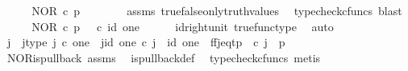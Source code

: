 \begin{isabellebody}
\ \ \isamarkupfalse%
\ \isamarkupfalse%
\ {\isachardoublequoteopen}NOR\ {\isasymcirc}\isactrlsub c\ {\isasymlangle}{\isasymt}{\isacharcomma}{\kern0pt}p{\isasymrangle}\ {\isacharequal}{\kern0pt}\ {\isasymt}{\isachardoublequoteclose}\isanewline
\ \ \ \ \isamarkupfalse%
\ assms\ true{\isacharunderscore}{\kern0pt}false{\isacharunderscore}{\kern0pt}only{\isacharunderscore}{\kern0pt}truth{\isacharunderscore}{\kern0pt}values\ \isamarkupfalse%
\ {\isacharparenleft}{\kern0pt}typecheck{\isacharunderscore}{\kern0pt}cfuncs{\isacharcomma}{\kern0pt}\ blast{\isacharparenright}{\kern0pt}\isanewline
\ \ \isamarkupfalse%
\ \isamarkupfalse%
\ {\isachardoublequoteopen}NOR\ {\isasymcirc}\isactrlsub c\ {\isasymlangle}{\isasymt}{\isacharcomma}{\kern0pt}p{\isasymrangle}\ {\isacharequal}{\kern0pt}\ {\isasymt}\ {\isasymcirc}\isactrlsub c\ id\ one{\isachardoublequoteclose}\isanewline
\ \ \ \ \isamarkupfalse%
\ id{\isacharunderscore}{\kern0pt}right{\isacharunderscore}{\kern0pt}unit{}\ true{\isacharunderscore}{\kern0pt}func{\isacharunderscore}{\kern0pt}type\ \isamarkupfalse%
\ auto\isanewline
\ \ \isamarkupfalse%
\ \isamarkupfalse%
\ j\ \ j{\isacharunderscore}{\kern0pt}type{\isacharcolon}{\kern0pt}\ {\isachardoublequoteopen}j\ {\isasymin}\isactrlsub c\ one{\isachardoublequoteclose}\ \ j{\isacharunderscore}{\kern0pt}id{\isacharcolon}{\kern0pt}\ {\isachardoublequoteopen}{\isasymbeta}\isactrlbsub one\isactrlesub \ {\isasymcirc}\isactrlsub c\ j\ {\isacharequal}{\kern0pt}\ id\ one{\isachardoublequoteclose}\ \ ff{\isacharunderscore}{\kern0pt}j{\isacharunderscore}{\kern0pt}eq{\isacharunderscore}{\kern0pt}tp{\isacharcolon}{\kern0pt}\ {\isachardoublequoteopen}{\isasymlangle}{\isasymf}{\isacharcomma}{\kern0pt}{\isasymf}{\isasymrangle}\ {\isasymcirc}\isactrlsub c\ j\ {\isacharequal}{\kern0pt}\ {\isasymlangle}{\isasymt}{\isacharcomma}{\kern0pt}p{\isasymrangle}{\isachardoublequoteclose}\isanewline
\ \ \ \ \isamarkupfalse%
\ NOR{\isacharunderscore}{\kern0pt}is{\isacharunderscore}{\kern0pt}pullback\ assms\ \isamarkupfalse%
\ is{\isacharunderscore}{\kern0pt}pullback{\isacharunderscore}{\kern0pt}def\ \isamarkupfalse%
\ {\isacharparenleft}{\kern0pt}typecheck{\isacharunderscore}{\kern0pt}cfuncs{\isacharcomma}{\kern0pt}\ metis{\isacharparenright}{\kern0pt}\isanewline
\ \ \isamarkupfalse%
\ \isamarkupfalse%

\end{isabellebody}

